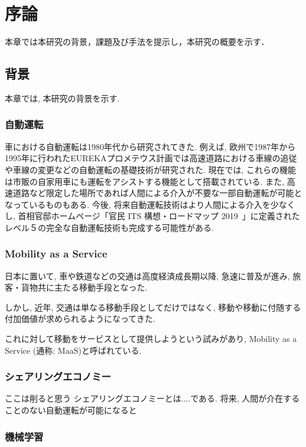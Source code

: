 \chapter{序論}
\label{introduction}

本章では本研究の背景，課題及び手法を提示し，本研究の概要を示す．

\section{背景}
\label{introduction:background}

本章では, 本研究の背景を示す.

\subsection{自動運転}

車における自動運転は1980年代から研究されてきた.
例えば, 欧州で1987年から1995年に行われたEUREKAプロメテウス計画では高速道路における車線の追従や車線の変更などの自動運転の基礎技術が研究された.
現在では, これらの機能は市販の自家用車にも運転をアシストする機能として搭載されている. また, 高速道路など限定した場所であれば人間による介入が不要な一部自動運転が可能となっているものもある.
今後, 将来自動運転技術はより人間による介入を少なくし, 首相官邸ホームページ「官民 ITS 構想・ロードマップ 2019~\cite{ITS}」に定義されたレベル５の完全な自動運転技術も完成する可能性がある.


\subsection{Mobility as a Service}

日本に置いて, 車や鉄道などの交通は高度経済成長期以降, 急速に普及が進み, 旅客・貨物共に主たる移動手段となった. 

しかし, 近年, 交通は単なる移動手段としてだけではなく, 移動や移動に付随する付加価値が求められるようになってきた.

これに対して移動をサービスとして提供しようという試みがあり, Mobility as a Service (通称: MaaS)と呼ばれている.

\subsection{シェアリングエコノミー}

ここは削ると思う
シェアリングエコノミーとは....である. 将来, 人間が介在することのない自動運転が可能になると

\subsection{機械学習}

